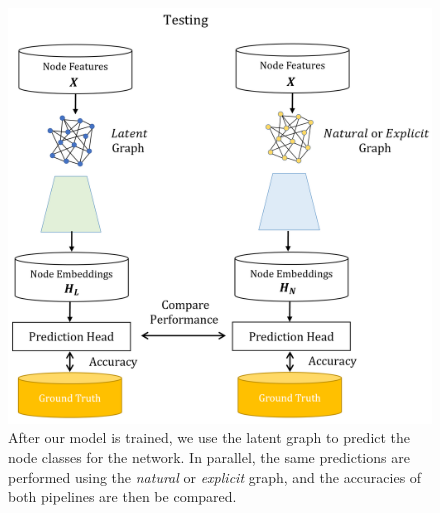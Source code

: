 \documentclass[12pt,a4paper]{article}
\begin{document}
	\begin{figure}[hbtp]
		\centering \includegraphics[scale=0.4]{eval_part3_1.png}
		\caption{After our model is trained, we use the latent graph to predict the node classes for the network. In parallel, the same predictions are performed using the \emph{natural} or \emph{explicit} graph, and the accuracies of both pipelines are then be compared. \label{eval3_1}}
	\end{figure}
\end{document}
